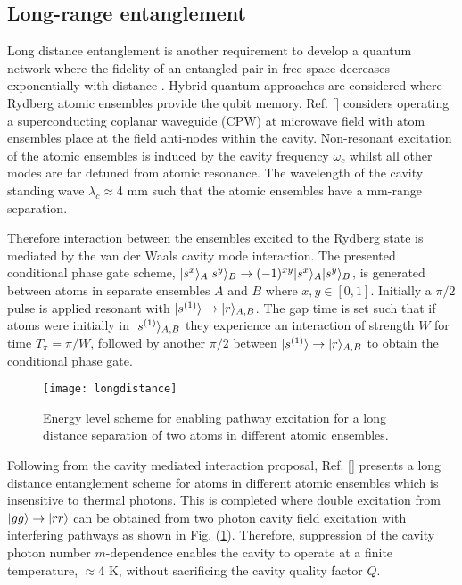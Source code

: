 \subsection{Long-range entanglement}


Long distance entanglement is another requirement to develop a quantum network where the fidelity of an entangled pair in free space decreases exponentially with distance \citep{Sangouard2011QuantumOptics}. Hybrid quantum approaches are considered where Rydberg atomic ensembles provide the qubit memory. Ref. [] considers operating a superconducting coplanar waveguide (CPW) at microwave field with atom ensembles place at the field anti-nodes within the cavity. Non-resonant excitation of the atomic ensembles is induced by the cavity frequency $\omega_{c}$ whilst all other modes are far detuned from atomic resonance. The wavelength of the cavity standing wave $\lambda_{c} \approx$4 mm such that the atomic ensembles have a mm-range separation. 

Therefore interaction between the ensembles excited to the Rydberg state is mediated by the van der Waals cavity mode interaction. The presented conditional phase gate scheme, $\lvert s^{x}\rangle_{A}\lvert s^{y}\rangle_{B}\rightarrow (-1)^{xy}\lvert s^{x}\rangle_{A}\lvert s^{y}\rangle_{B}$, is generated between atoms in separate ensembles $A$ and $B$ where $x, y ∈ [0, 1]$. Initially a $\pi/2$ pulse is applied resonant with $\lvert s^{(1)}\rangle\rightarrow\lvert r\rangle_{A,B}$. The gap time is set such that if atoms were initially in $\lvert s^{(1)}\rangle_{A,B}$ they experience an interaction of strength $W$ for time $T_{\pi}=\pi/W$, followed by another $\pi/2$ between $\lvert s^{(1)}\rangle\rightarrow\lvert r\rangle_{A,B}$ to obtain the conditional phase gate.  
\begin{figure}[t]
\centering
\texttt{[image: longdistance]}
\caption{\label{fig:longdistance} Energy level scheme for enabling pathway excitation for a long distance separation of two atoms in different atomic ensembles.}
\end{figure}

Following from the cavity mediated interaction proposal, Ref. [] presents a long distance entanglement scheme for atoms in different atomic ensembles which is insensitive to thermal photons. This is completed where double excitation from $\lvert gg\rangle\rightarrow \lvert rr\rangle$ can be obtained from two photon cavity field excitation with interfering pathways as shown in Fig. (\ref{fig:longdistance}). Therefore, suppression of the cavity photon number $m$-dependence enables the cavity to operate at a finite temperature, $\approx$4 K, without sacrificing the cavity quality factor $Q$. 

